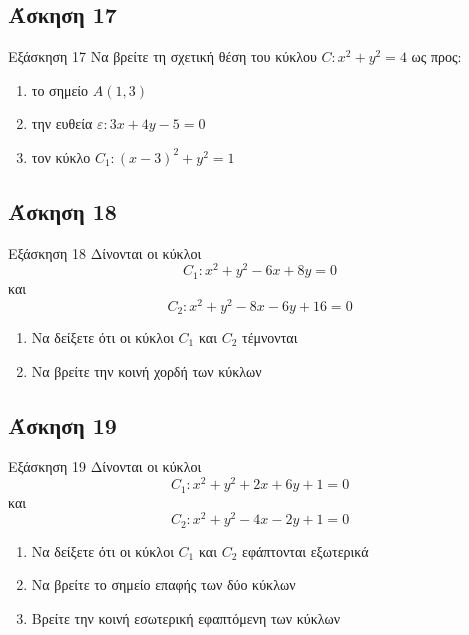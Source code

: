 \documentclass[greek]{beamer}
\begin{document}
\subsection{Άσκηση 17}
\begin{frame}[label=Άσκηση17,t]{Εξάσκηση 17}
  Να βρείτε τη σχετική θέση του κύκλου $C:x^2+y^2=4$ ως προς:
  \begin{enumerate}
    \item<1-> το σημείο $Α(1,3)$
    \item<2-> την ευθεία $ε:3x+4y-5=0$
    \item<3-> τον κύκλο $C_1:(x-3)^2+y^2=1$
  \end{enumerate}

\end{frame}

\subsection{Άσκηση 18}
\begin{frame}[label=Άσκηση18,t]{Εξάσκηση 18}
  Δίνονται οι κύκλοι
  $$C_1:x^2+y^2-6x+8y=0$$
  και
  $$C_2:x^2+y^2-8x-6y+16=0$$
  \begin{enumerate}
    \item<1-> Να δείξετε ότι οι κύκλοι $C_1$ και $C_2$ τέμνονται
    \item<2-> Να βρείτε την κοινή χορδή των κύκλων
  \end{enumerate}

\end{frame}

\subsection{Άσκηση 19}
\begin{frame}[label=Άσκηση19,t]{Εξάσκηση 19}
  Δίνονται οι κύκλοι
  $$C_1:x^2+y^2+2x+6y+1=0$$
  και
  $$C_2:x^2+y^2-4x-2y+1=0$$
  \begin{enumerate}
    \item<1-> Να δείξετε ότι οι κύκλοι $C_1$ και $C_2$ εφάπτονται εξωτερικά
    \item<2-> Να βρείτε το σημείο επαφής των δύο κύκλων
    \item<3-> Βρείτε την κοινή εσωτερική εφαπτόμενη των κύκλων
  \end{enumerate}

\end{frame}
\end{document}
